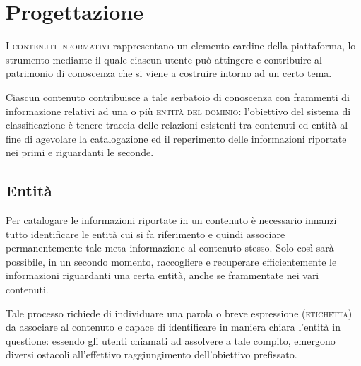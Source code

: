 \documentclass[10pt,a4paper,headinclude,footinclude,hidelinks]{scrreprt} %
\begin{document}
	\chapter{Progettazione}
	\label{ch:stage:design}

	I \textsc{contenuti informativi} rappresentano un elemento cardine della piattaforma, lo strumento mediante il quale ciascun utente può attingere e contribuire al patrimonio di conoscenza che si viene a costruire intorno ad un certo tema.


	Ciascun contenuto contribuisce a tale serbatoio di conoscenza con frammenti di informazione relativi ad una o più \textsc{entità del dominio}: l'obiettivo del sistema di classificazione è tenere traccia delle relazioni esistenti tra contenuti ed entità al fine di agevolare la catalogazione ed il reperimento delle informazioni riportate nei primi e riguardanti le seconde.


	\section{Entit\`a}
	\label{sec:stage:design:entità}

	Per catalogare le informazioni riportate in un contenuto è necessario innanzi tutto identificare le entità cui si fa riferimento e quindi associare permanentemente tale meta-informazione al contenuto stesso. Solo così sarà possibile, in un secondo momento, raccogliere e recuperare efficientemente le informazioni riguardanti una certa entità, anche se frammentate nei vari contenuti.

	Tale processo richiede di individuare una parola o breve espressione (\textsc{etichetta}) da associare al contenuto e capace di identificare in maniera chiara l'entità in questione: essendo gli utenti chiamati ad assolvere a tale compito, emergono diversi ostacoli all'effettivo raggiungimento dell'obiettivo prefissato.
\end{document}
